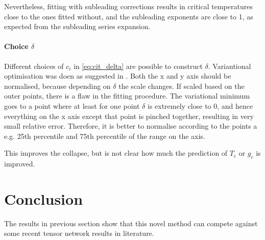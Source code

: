 Nevertheless, fitting with subleading corrections results in critical temperatures close to the ones fitted without, and the subleading exponents are close to 1, as expected from the subleading series expansion.

\paragraph{ Choice  $\delta$  }

Different choices of $c_i$ in \cref{eq:cit_delta} are possible to construct $\delta$.  Variantional optimisation was doen as suggested in \cite{Nietner2020}. Both the x and y axis should be normalised, because depending on $\delta$ the scale changes. If scaled based on the outer points, there is a flaw in the fitting procedure.  The variational minimum goes to a point where at least for one point $\delta$ is extremely close to 0, and hence everything on the x axis except that point is pinched together, resulting in very small relative error. Therefore, it is better to normalise according to the points a e.g. 25th percentile and 75th percentile of the range on the  axis.

This improves the collapse, but is not clear how much the prediction of $T_c$ or $g_c$ is improved.

\section{Conclusion}

The results in previous section show that this novel method can compete against some recent tensor network results in literature.